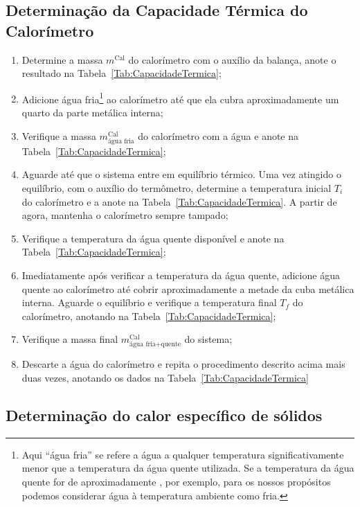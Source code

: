 \subsection{Determinação da Capacidade Térmica do Calorímetro} %
\begin{enumerate}
	\item Determine a massa $m^{\text{Cal}}$ do calorímetro com o auxílio da balança, anote o resultado na Tabela~\ref{Tab:CapacidadeTermica};
	\item Adicione água fria\footnote{Aqui ``água fria'' se refere a água a qualquer temperatura significativamente menor que a temperatura da água quente utilizada. Se a temperatura da água quente for de aproximadamente , por exemplo, para os nossos propósitos podemos considerar água à temperatura ambiente como fria.} ao calorímetro até que ela cubra aproximadamente um quarto da parte metálica interna;
	\item Verifique a massa $m^{\text{Cal}}_{\text{água fria}}$ do calorímetro com a água e anote na Tabela~\ref{Tab:CapacidadeTermica};
	\item Aguarde até que o sistema entre em equilíbrio térmico. Uma vez atingido o equilíbrio, com o auxílio do termômetro, determine a temperatura inicial $T_i$ do calorímetro e a anote na Tabela~\ref{Tab:CapacidadeTermica}. A partir de agora, mantenha o calorímetro sempre tampado;
	\item Verifique a temperatura da água quente disponível e anote na Tabela~\ref{Tab:CapacidadeTermica};
	\item Imediatamente após verificar a temperatura da água quente, adicione água quente ao calorímetro até cobrir aproximadamente a metade da cuba metálica interna. Aguarde o equilíbrio e verifique a temperatura final $T_f$ do calorímetro, anotando na Tabela~\ref{Tab:CapacidadeTermica};
	\item Verifique a massa final $m^{\text{Cal}}_{\text{água fria+quente}}$ do sistema;
	\item Descarte a água do calorímetro e repita o procedimento descrito acima mais duas vezes, anotando os dados na Tabela~\ref{Tab:CapacidadeTermica}
\end{enumerate}

\subsection{Determinação do calor específico de sólidos}


